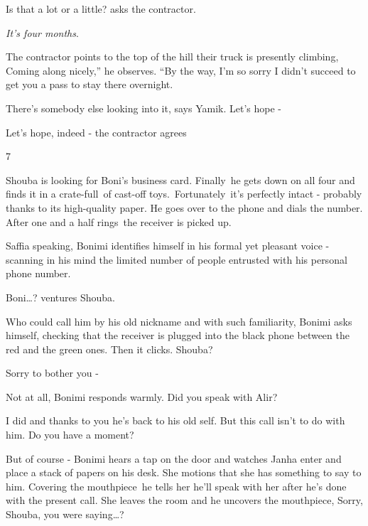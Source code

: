 \documentclass[twoside,11pt]{book}
\begin{document}
{\textquotedbl}Is that a lot or a little?{\textquotedbl} asks the contractor. 

{\textquotedbl}\textit{It's four months}.{\textquotedbl} 

The contractor points to the top of the hill their truck is presently climbing, {\textquotedbl}Coming along nicely,'' he
observes. ``By the way, I'm so sorry I didn't succeed to get you a pass to stay there overnight.{\textquotedbl} 

{\textquotedbl}There's somebody else looking into it,{\textquotedbl} says Yamik. {\textquotedbl}Let's hope
-{\textquotedbl} 

{\textquotedbl}Let's hope, indeed -{\textquotedbl} the contractor agrees


\bigskip

7\ \ 

Shouba is looking for Boni's business card. Finally\ he gets down on all four and finds it in a crate-full~of cast-off
toys.\ Fortunately\ it's perfectly intact -  probably thanks to its high-quality paper. He goes over to the phone and
dials the number. After one and a half rings~the receiver is picked up.

{\textquotedbl}Saffia speaking,{\textquotedbl} Bonimi identifies himself in his formal yet pleasant voice - scanning in
his mind the limited number of people entrusted with his personal phone number.

{\textquotedbl}Boni{\dots}?{\textquotedbl} ventures Shouba. 

Who could call him by his old nickname and with such familiarity, Bonimi asks himself, checking that the receiver is
plugged into the black phone between the red and the green ones. Then it clicks. {\textquotedbl}Shouba?{\textquotedbl} 

{\textquotedbl}Sorry to bother you -{\textquotedbl}\ 

{\textquotedbl}Not at all,{\textquotedbl} Bonimi responds warmly. {\textquotedbl}Did you speak with Alir?{\textquotedbl}

{\textquotedbl}I did and thanks to you he's back to his old self. But this call isn't to do with him. Do you have a
moment?{\textquotedbl}

{\textquotedbl}But of course -{\textquotedbl} Bonimi hears a tap on the door and watches Janha enter and place a stack
of papers on his desk. She motions that she has something to say to him. Covering the mouthpiece\ he tells her he'll
speak with her after he's done with the present call. She leaves the room and he uncovers the mouthpiece,
{\textquotedbl}Sorry, Shouba, you were saying{\dots}?{\textquotedbl}\ 
\end{document}
